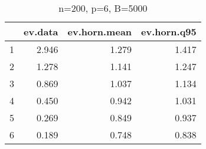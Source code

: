 \begin{table}[ht]
\centering
\begin{tabular}{rrrr}
  \hline
 & ev.data & ev.horn.mean & ev.horn.q95 \\ 
  \hline
1 & 2.946 & 1.279 & 1.417 \\ 
  2 & 1.278 & 1.141 & 1.247 \\ 
  3 & 0.869 & 1.037 & 1.134 \\ 
  4 & 0.450 & 0.942 & 1.031 \\ 
  5 & 0.269 & 0.849 & 0.937 \\ 
  6 & 0.189 & 0.748 & 0.838 \\ 
   \hline
\end{tabular}
\caption{n=200, p=6, B=5000} 
\end{table}
